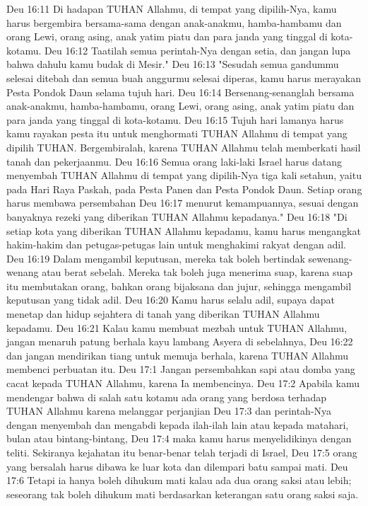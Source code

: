 Deu 16:11  Di hadapan TUHAN Allahmu, di tempat yang dipilih-Nya, kamu harus bergembira bersama-sama dengan anak-anakmu, hamba-hambamu dan orang Lewi, orang asing, anak yatim piatu dan para janda yang tinggal di kota-kotamu.
Deu 16:12  Taatilah semua perintah-Nya dengan setia, dan jangan lupa bahwa dahulu kamu budak di Mesir."
Deu 16:13  "Sesudah semua gandummu selesai ditebah dan semua buah anggurmu selesai diperas, kamu harus merayakan Pesta Pondok Daun selama tujuh hari.
Deu 16:14  Bersenang-senanglah bersama anak-anakmu, hamba-hambamu, orang Lewi, orang asing, anak yatim piatu dan para janda yang tinggal di kota-kotamu.
Deu 16:15  Tujuh hari lamanya harus kamu rayakan pesta itu untuk menghormati TUHAN Allahmu di tempat yang dipilih TUHAN. Bergembiralah, karena TUHAN Allahmu telah memberkati hasil tanah dan pekerjaanmu.
Deu 16:16  Semua orang laki-laki Israel harus datang menyembah TUHAN Allahmu di tempat yang dipilih-Nya tiga kali setahun, yaitu pada Hari Raya Paskah, pada Pesta Panen dan Pesta Pondok Daun. Setiap orang harus membawa persembahan
Deu 16:17  menurut kemampuannya, sesuai dengan banyaknya rezeki yang diberikan TUHAN Allahmu kepadanya."
Deu 16:18  "Di setiap kota yang diberikan TUHAN Allahmu kepadamu, kamu harus mengangkat hakim-hakim dan petugas-petugas lain untuk menghakimi rakyat dengan adil.
Deu 16:19  Dalam mengambil keputusan, mereka tak boleh bertindak sewenang-wenang atau berat sebelah. Mereka tak boleh juga menerima suap, karena suap itu membutakan orang, bahkan orang bijaksana dan jujur, sehingga mengambil keputusan yang tidak adil.
Deu 16:20  Kamu harus selalu adil, supaya dapat menetap dan hidup sejahtera di tanah yang diberikan TUHAN Allahmu kepadamu.
Deu 16:21  Kalau kamu membuat mezbah untuk TUHAN Allahmu, jangan menaruh patung berhala kayu lambang Asyera di sebelahnya,
Deu 16:22  dan jangan mendirikan tiang untuk memuja berhala, karena TUHAN Allahmu membenci perbuatan itu.
Deu 17:1  Jangan persembahkan sapi atau domba yang cacat kepada TUHAN Allahmu, karena Ia membencinya.
Deu 17:2  Apabila kamu mendengar bahwa di salah satu kotamu ada orang yang berdosa terhadap TUHAN Allahmu karena melanggar perjanjian
Deu 17:3  dan perintah-Nya dengan menyembah dan mengabdi kepada ilah-ilah lain atau kepada matahari, bulan atau bintang-bintang,
Deu 17:4  maka kamu harus menyelidikinya dengan teliti. Sekiranya kejahatan itu benar-benar telah terjadi di Israel,
Deu 17:5  orang yang bersalah harus dibawa ke luar kota dan dilempari batu sampai mati.
Deu 17:6  Tetapi ia hanya boleh dihukum mati kalau ada dua orang saksi atau lebih; seseorang tak boleh dihukum mati berdasarkan keterangan satu orang saksi saja.
